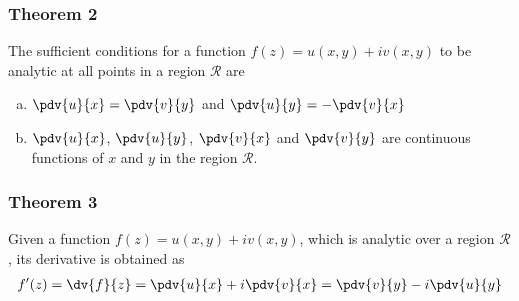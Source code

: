 		\subsubsection*{Theorem 2}
			The sufficient conditions for a function $f(z)=u(x,y)+iv(x,y)$ to be analytic at all points in a region $\mathcal{R}$ are
			\begin{enumerate}[a)]
				\item $\pdv{u}{x}=\pdv{v}{y}$ and $\pdv{u}{y}=-\pdv{v}{x}$
				\item $\pdv{u}{x}$, $\pdv{u}{y}$, $\pdv{v}{x}$ and $\pdv{v}{y}$ are continuous functions of $x$ and $y$ in the region $\mathcal{R}$.
			\end{enumerate}
			
		\subsubsection*{Theorem 3}
			Given a function $f(z)=u(x,y)+iv(x,y)$, which is analytic over a region $\mathcal{R}$, its derivative is obtained as
			\begin{align*}
				f'(z)=\dv{f}{z}=\pdv{u}{x}+i\pdv{v}{x}=\pdv{v}{y}-i\pdv{u}{y}
			\end{align*}
		
